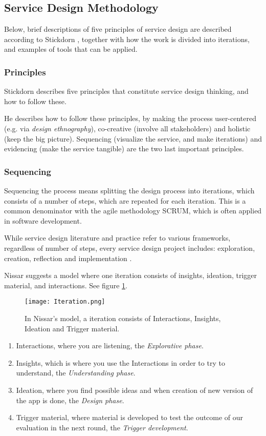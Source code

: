 \subsection{Service Design Methodology}

Below, brief descriptions of five principles of service design are described according to Stickdorn \citep{stickdorn}, together with how the work is divided into iterations, and examples of tools that can be applied.

\subsubsection{Principles}
Stickdorn \citep{stickdorn} describes five principles that constitute service design thinking, and how to follow these.

He describes how to follow these principles, by making the process user-centered (e.g. via \textit{design ethnography}), co-creative (involve all stakeholders) and holistic (keep the big picture). Sequencing (visualize the service, and make iterations) and evidencing (make the service tangible) are the two last important principles.

\subsubsection{Sequencing}
Sequencing the process means splitting the design process into iterations, which consists of a number of steps, which are repeated for each iteration. This is a common denominator with the agile methodology SCRUM, which is often applied in software development.

While service design literature and practice refer to various frameworks, regardless of number of steps, every service design project includes: exploration, creation, reflection and implementation \citep{stickdorn}.

Nissar \citep{expedition-mondial} suggests a model where one iteration consists of insights, ideation, trigger material, and interactions. See figure \ref{fig:iteration}.

\begin{figure}[h]
    \centering
    \texttt{[image: Iteration.png]}
    \caption{In Nissar's model, a iteration consists of Interactions, Insights, Ideation and Trigger material.}
    \label{fig:iteration}
\end{figure}

\begin{enumerate}
\item Interactions, where you are listening, the \textit{Explorative phase}.
\item Insights, which is where you use the Interactions in order to try to understand, the \textit{Understanding phase}. %
\item Ideation, where you find possible ideas and when creation of new version of the app is done, the \textit{Design phase}.
\item Trigger material, where material is developed to test the outcome of our evaluation in the next round, the \textit{Trigger development}.
\end{enumerate}

